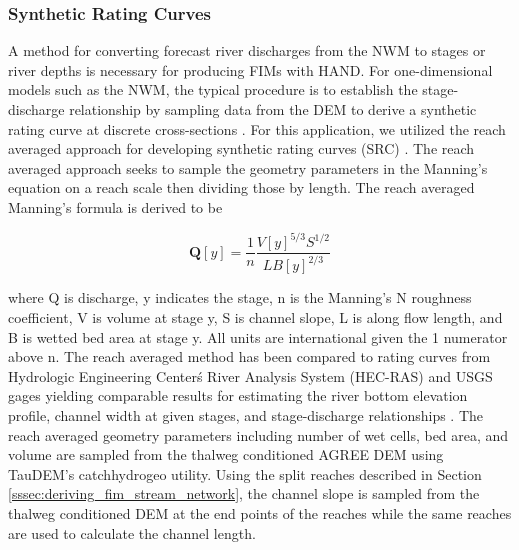 \subsubsection{Synthetic Rating Curves}
\label{sssec:synthetic_rating_curve}
%
 A method for converting forecast river discharges from the NWM to stages or river depths is necessary for producing FIMs with HAND. 
For one-dimensional models such as the NWM, the typical procedure is to establish the stage-discharge relationship by sampling data from the DEM to derive a synthetic rating curve at discrete cross-sections \cite{quintero2021development,di2011hydraulic}. 
For this application, we utilized the reach averaged approach for developing synthetic rating curves (SRC) \cite{zheng2018river}.
The reach averaged approach seeks to sample the geometry parameters in the Manning's equation \cite{gauckler1867etudes,manning1890flow} on a reach scale then dividing those by length. 
The reach averaged Manning's formula is derived to be 
%
\begin{linenomath*}
\begin{equation}
\label{eq:reach_averaged_mannings_equation}
\textbf{Q}[y] = \frac{1}{n} \frac{V[y]^{5/3}S^{1/2}}{L B[y]^{2/3}} 
\end{equation}
\end{linenomath*}
%
where Q is discharge, y indicates the stage, n is the Manning's N roughness coefficient, V is volume at stage y, S is channel slope, L is along flow length, and B is wetted bed area at stage y.
All units are international given the 1 numerator above n.
The reach averaged method has been compared to rating curves from Hydrologic Engineering Center\'s River Analysis System (HEC-RAS) and USGS gages yielding comparable results for estimating the river bottom elevation profile, channel width at given stages, and stage-discharge relationships \cite{zheng2018river}.
The reach averaged geometry parameters including number of wet cells, bed area, and volume are sampled from the thalweg conditioned AGREE DEM using TauDEM's catchhydrogeo utility.
Using the split reaches described in Section \ref{sssec:deriving_fim_stream_network}, the channel slope is sampled from the thalweg conditioned DEM at the end points of the reaches while the same reaches are used to calculate the channel length.


